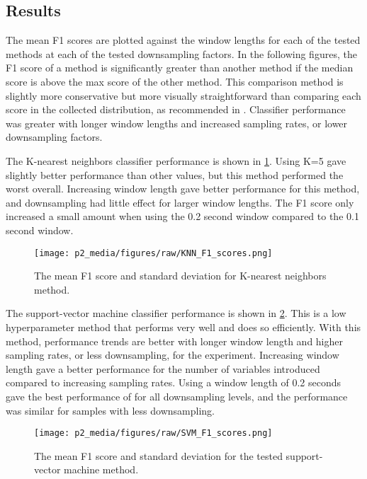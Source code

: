 \subsection{Results}

The mean F1 scores are plotted against the window lengths for each of the tested methods 
at each of the tested downsampling factors.
In the following figures, the F1 score of a method is significantly greater than another method
if the median score is above the max score of the other method.
This comparison method is slightly more conservative but more visually straightforward
than comparing each score in the collected distribution,
as recommended in \cite{Goutte2005}.
Classifier performance was greater with longer window lengths and 
increased sampling rates, or lower downsampling factors.

The K-nearest neighbors classifier performance is shown in \ref{fig:perf_KNN}.
Using K=5 gave slightly better performance than other values, 
but this method performed the worst overall.
Increasing window length gave better performance for this method, and downsampling had little effect
for larger window lengths. 
The F1 score only increased a small amount when using the 0.2 second window compared to the 0.1 second window.

\begin{figure}[h]
\centering
\texttt{[image: p2\_media/figures/raw/KNN\_F1\_scores.png]}
\caption{The mean F1 score and standard deviation for K-nearest neighbors method. 
}
\label{fig:perf_KNN}
\end{figure}

The support-vector machine classifier performance is shown in \ref{fig:perf_SVM}.
This is a low hyperparameter method that performs very well and does so efficiently. 
With this method, performance trends are better with longer window length and higher sampling rates, 
or less downsampling, for the experiment. Increasing window length gave a better performance for 
the number of variables introduced compared to increasing sampling rates. 
Using a window length of 0.2 seconds gave the best performance of for all downsampling levels, 
and the performance was similar for samples with less downsampling.

\begin{figure}[h]
\centering
\texttt{[image: p2\_media/figures/raw/SVM\_F1\_scores.png]}
\caption{The mean F1 score and standard deviation for the tested support-vector machine method.
}
\label{fig:perf_SVM}
\end{figure}

